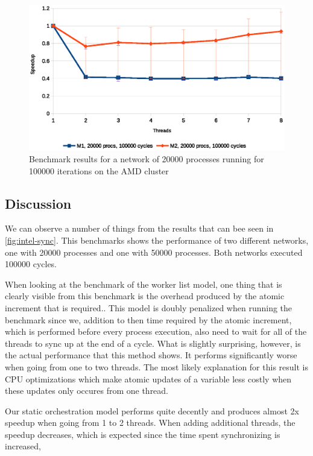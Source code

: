 \begin{figure}
\centering
\includegraphics[width=\textwidth]{graphs/amd-sync}
\caption[Synchronization-dominated benchmark on AMD cluster]{Benchmark results for a network of 20000 processes running
for 100000 iterations on the AMD cluster}
\label{fig:amd-sync}
\end{figure}


\subsection{Discussion}
We can observe a number of things from the results that can bee seen
in \cref{fig:intel-sync}.  This benchmarks shows the performance of
two different networks, one with 20000 processes and one with 50000
processes. Both networks executed 100000 cycles.

When looking at the benchmark of the worker list model, one thing that
is clearly visible from this benchmark is the overhead produced by the
atomic increment that is required.. This model is doubly penalized
when running the benchmark since we, addition to then time required by
the atomic increment, which is performed before every process
execution, also need to wait for all of the threads to sync
up at the end of a cycle. What is slightly surprising, however, is the
actual performance that this method shows. It performs significantly
worse when going from one to two threads. The most likely explanation
for this result is CPU optimizations which make atomic updates of a
variable less costly when these updates only occures from one thread.

Our static orchestration model performs quite decently and produces
almost 2x speedup when going from 1 to 2 threads. When adding
additional threads, the speedup decreases, which is expected since the
time spent synchronizing is increased,


